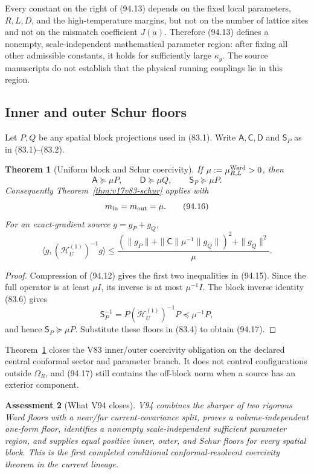 \documentclass[11pt]{article}
\newtheorem{theorem}{Theorem}[section]
\newtheorem{assessment}[theorem]{Assessment}
\theoremstyle{remark}
\begin{document}
Every constant on the right of (94.13) depends on the fixed local
parameters, \(R,L,D\), and the high-temperature margins, but not on
the number of lattice sites and not on the mismatch coefficient
\(J(a)\).  Therefore (94.13) defines a nonempty, scale-independent
mathematical parameter region: after fixing all other admissible
constants, it holds for sufficiently large \(\kappa_g\).  The source
manuscripts do not establish that the physical running couplings lie
in this region.

\subsection{Inner and outer Schur floors}

Let \(P,Q\) be any spatial block projections used in (83.1).  Write
\(\mathsf A,\mathsf C,\mathsf D\) and \(\mathsf S_P\) as in
(83.1)--(83.2).

\begin{theorem}[Uniform block and Schur coercivity]
\label{thm:v17v94-schur}
If \(\mu:=\mu_{R,L}^{\rm Ward}>0\), then
\[
 \mathsf A\succeq\mu P,
 \qquad
 \mathsf D\succeq\mu Q,
 \qquad
 \mathsf S_P\succeq\mu P.                          \tag{94.15}
\]
Consequently Theorem~\ref{thm:v17v83-schur} applies with
\[
 m_{\rm in}=m_{\rm out}=\mu.                        \tag{94.16}
\]
For an exact-gradient source \(g=g_P+g_Q\),
\[
 \langle g,(\mathscr H_U^{(1)})^{-1}g\rangle
 \leq
 \frac{(\|g_P\|+\|\mathsf C\|\mu^{-1}\|g_Q\|)^2
       +\|g_Q\|^2}{\mu}.                            \tag{94.17}
\]
\end{theorem}

\begin{proof}
Compression of (94.12) gives the first two inequalities in (94.15).
Since the full operator is at least \(\mu I\), its inverse is at most
\(\mu^{-1}I\).  The block inverse identity (83.6) gives
\[
 \mathsf S_P^{-1}
 =P(\mathscr H_U^{(1)})^{-1}P
 \preceq\mu^{-1}P,                                  \tag{94.18}
\]
and hence \(\mathsf S_P\succeq\mu P\).  Substitute these floors in
(83.4) to obtain (94.17).
\end{proof}

Theorem~\ref{thm:v17v94-schur} closes the V83 inner/outer coercivity
obligation on the declared central conformal sector and parameter
branch.  It does not control configurations outside \(\Omega_R\),
and (94.17) still contains the off-block norm when a source has an
exterior component.

\begin{assessment}[What V94 closes]
\label{ass:v17v94-status}
V94 combines the sharper of two rigorous Ward floors with a
near/far current-covariance split, proves a volume-independent
one-form floor, identifies a nonempty scale-independent sufficient
parameter region, and supplies equal positive inner, outer, and Schur
floors for every spatial block.  This is the first completed
conditional conformal-resolvent coercivity theorem in the current
lineage.
\end{assessment}
\end{document}
